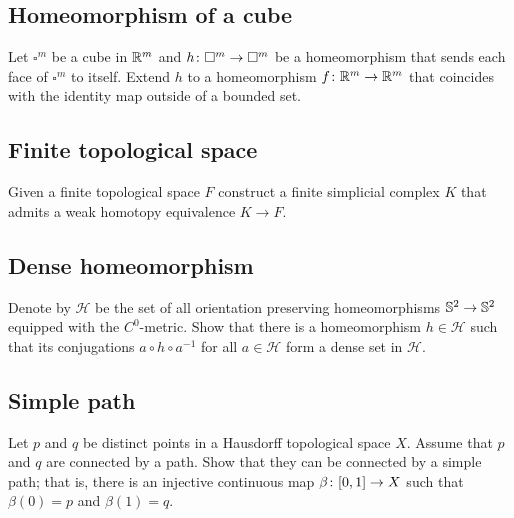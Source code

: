 \subsection*{Homeomorphism of a cube}\label{Homeomorphism of cube}

\begin{pr}
Let $\square^m$ be a cube in $\mathbb{R}^m$
and $h\:\square^m\z\to\square^m$ be
a homeomorphism that sends each face of $\square^m$ to itself.
Extend $h$ to a homeomorphism $f\colon\mathbb{R}^m\to\mathbb{R}^m$ that coincides with the identity map outside of a bounded set.    
\end{pr}

\subsection*{Finite topological space\easy}\label{Finite topological space}


\begin{pr}
Given a finite topological space $F$ 
construct a finite simplicial complex $K$
that admits a weak homotopy equivalence  $K\to F$. 
\end{pr}

\subsection*{Dense homeomorphism\easy}\label{Dense homeomorphism}

\begin{pr}
Denote by $\mathcal{H}$ be the set of all orientation preserving homeomorphisms $\mathbb {S}^2\z\to\mathbb {S}^2$ 
equipped with the $C^0$-metric.
Show that there is a homeomorphism $h\in \mathcal{H}$ such that its conjugations $a\circ h\circ a^{-1}$ for all $a\in\mathcal{H}$ form a dense set in $\mathcal{H}$.
 
\end{pr}

\subsection*{Simple path\easy}
\label{Simple path}

\begin{pr}
Let $p$ and $q$ be distinct points in a Hausdorff topological space $X$.
Assume that $p$ and $q$ are connected by a path.
Show that they can be connected by a simple path;
that is, there is an injective continuous map $\beta\:[0,1]\z\to X$
such that $\beta(0)=p$ and $\beta(1)=q$.
\end{pr}



